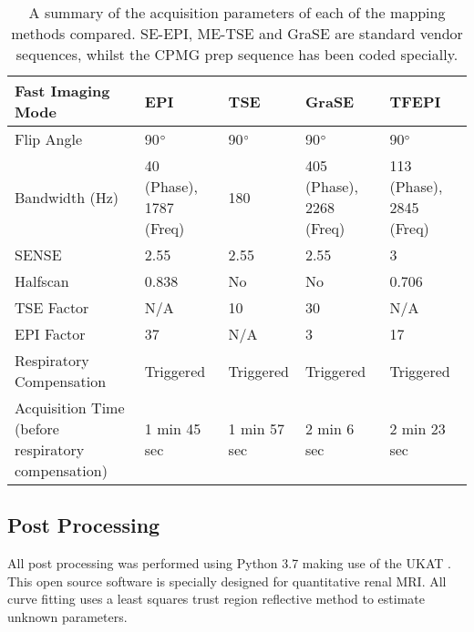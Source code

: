 \begin{table}[H]
\begin{adjustbox}{width=1.0\textwidth, center}
\begin{tabularx}{1.25\textwidth}{X|X|X|X|X}
		Fast   Imaging Mode                                  & EPI                             & TSE                        & GraSE              & TFEPI               \\ \hline
		Flip Angle                                           & 90$\degree$                     & 90$\degree$                & 90$\degree$        & 90$\degree$         \\ \hline
		Bandwidth   (Hz)                                     & 40 (Phase), 1787 (Freq)         & 180                        & 405 (Phase), 2268 (Freq) & 113 (Phase), 2845 (Freq)\\ \hline
		SENSE                                                & 2.55                            & 2.55                       & 2.55               & 3                   \\ \hline
		Halfscan                                             & 0.838                           & No                         & No                 & 0.706               \\ \hline
		TSE Factor                                           & N/A                             & 10                         & 30                 & N/A                 \\ \hline
		EPI Factor                                           & 37                              & N/A                        & 3                  & 17                  \\ \hline
		Respiratory Compensation                             & Triggered                       & Triggered                  & Triggered          & Triggered           \\ \hline
		Acquisition Time \scriptsize{(before respiratory compensation)} & 1 min 45 sec                & 1 min 57 sec               & 2 min 6 sec        & 2 min 23 sec  
	\end{tabularx}
	\end{adjustbox}
	\caption{A summary of the acquisition parameters of each of the \ttwo mapping methods compared. \ac{SE}-\ac{EPI}, \ac{ME-TSE} and \ac{GraSE} are standard vendor sequences, whilst the \ac{CPMG} \ttwo prep sequence has been coded specially.}
	\label{tab:t2_sequence_overview}
\end{table}

\subsection{Post Processing}

All post processing was performed using Python 3.7 making use of the \ac{UKAT} \cite{daniel_ukrin_2021, nery_ukrin_2020}. This open source software is specially designed for quantitative renal \ac{MRI}. All curve fitting uses a least squares trust region reflective method to estimate unknown parameters.

